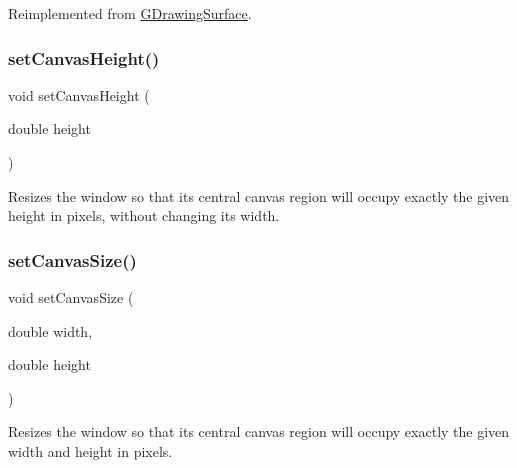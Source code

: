 Reimplemented from \mbox{\hyperlink{classGDrawingSurface_ab4677ab2474e68b07aa56605af92a84a}{G\+Drawing\+Surface}}.

\mbox{\label{classGWindow_a059f69fab57ad2cca2243c5a64f7306d}} 
\subsubsection{\texorpdfstring{set\+Canvas\+Height()}{setCanvasHeight()}}
{\footnotesize\ttfamily void set\+Canvas\+Height (\begin{DoxyParamCaption}\item[{double}]{height }\end{DoxyParamCaption})\hspace{0.3cm}{\ttfamily [virtual]}}



Resizes the window so that its central canvas region will occupy exactly the given height in pixels, without changing its width. 

\mbox{\label{classGWindow_a06022723e253be88ca7e48034ff66244}} 
\subsubsection{\texorpdfstring{set\+Canvas\+Size()}{setCanvasSize()}\hspace{0.1cm}{\footnotesize\ttfamily [1/2]}}
{\footnotesize\ttfamily void set\+Canvas\+Size (\begin{DoxyParamCaption}\item[{double}]{width,  }\item[{double}]{height }\end{DoxyParamCaption})\hspace{0.3cm}{\ttfamily [virtual]}}



Resizes the window so that its central canvas region will occupy exactly the given width and height in pixels. 

\mbox{\label{classGWindow_a22f0f065a223a3c0ae5173316ece1dc1}} 
